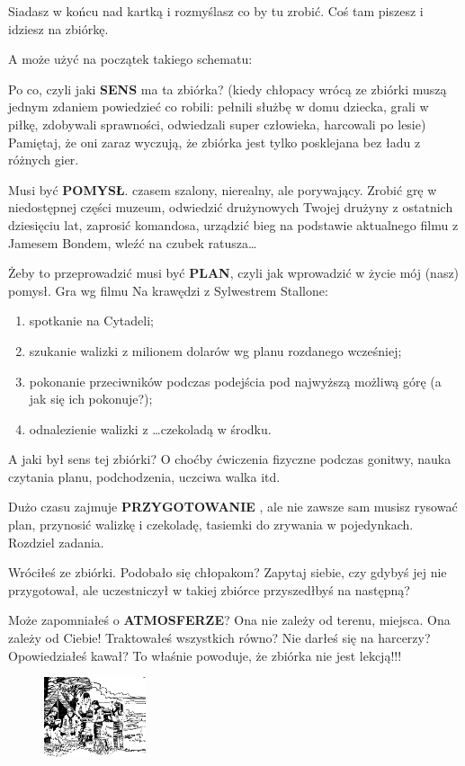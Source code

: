 Siadasz w końcu nad kartką i rozmyślasz co by tu zrobić. Coś tam piszesz i  idziesz na zbiórkę. 
	
A może użyć  na  początek  takiego schematu:

Po co, czyli jaki \textbf{SENS} ma ta zbiórka? 
(kiedy chłopacy wrócą ze zbiórki muszą jednym zdaniem powiedzieć co robili: pełnili służbę w domu dziecka, grali w piłkę, zdobywali sprawności, odwiedzali super człowieka, harcowali po lesie) 
Pamiętaj, że oni zaraz wyczują, że zbiórka jest  tylko posklejana bez ładu z różnych gier.

Musi być \textbf{POMYSŁ}. czasem szalony, nierealny, ale porywający. Zrobić grę w niedostępnej części muzeum, odwiedzić drużynowych Twojej drużyny z ostatnich dziesięciu lat, zaprosić komandosa, urządzić bieg na podstawie aktualnego filmu z Jamesem Bondem, wleźć na czubek ratusza\ldots

Żeby to przeprowadzić musi być \textbf{PLAN}, czyli jak wprowadzić w życie mój (nasz) pomysł.
Gra  wg filmu Na  krawędzi z Sylwestrem Stallone:
\begin{enumerate} 
\item spotkanie na Cytadeli;
\item szukanie walizki z milionem dolarów wg planu rozdanego wcześniej;
\item pokonanie przeciwników podczas podejścia pod najwyższą możliwą górę (a jak  się  ich  pokonuje?);
\item odnalezienie walizki z \ldots czekoladą w środku.
\end{enumerate}
A jaki był  sens tej zbiórki? 
O choćby ćwiczenia fizyczne podczas gonitwy, nauka czytania planu, podchodzenia, uczciwa walka itd.
	
Dużo czasu  zajmuje \textbf{PRZYGOTOWANIE} , ale nie zawsze sam musisz  rysować plan, przynosić walizkę i czekoladę, tasiemki do zrywania w pojedynkach. 
Rozdziel zadania.

Wróciłeś ze zbiórki. Podobało  się chłopakom?
Zapytaj siebie, czy gdybyś jej nie  przygotował, ale uczestniczył w takiej zbiórce przyszedłbyś na następną?
	
Może zapomniałeś o \textbf{ATMOSFERZE}? 
Ona nie zależy od terenu, miejsca. 
Ona zależy  od Ciebie! 
Traktowałeś wszystkich równo? 
Nie darłeś się na harcerzy? 
Opowiedziałeś kawał? 
To właśnie powoduje, że zbiórka nie jest lekcją!!!
\begin{figure}
\begin{center}
\includegraphics[width=3cm]{grafiki/zbiorkazastepu.png}
\end{center}
\end{figure}
